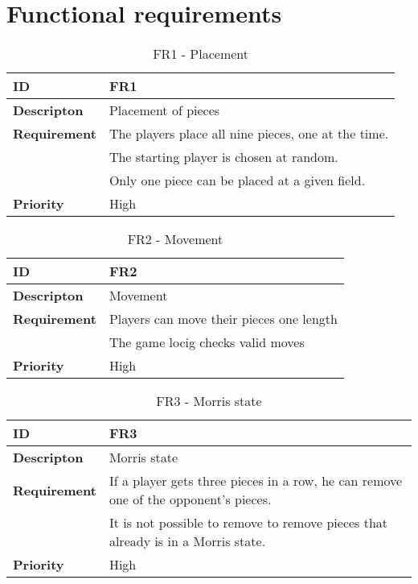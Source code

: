 \section{Functional requirements}

\begin{table}[h!]
\begin{tabular}{ | p{90pt} | p{270pt}  |}
\hline
\bf ID &  FR1  \\ \hline
\bf Descripton & Placement of pieces \\ \hline 
\bf Requirement & The players place all nine pieces, one at the time.  \\   
& The starting player is chosen at random. \\ 
& Only one piece can be placed at a given field. \\ \hline
\bf Priority & High \\ \hline

\end{tabular}
\caption{FR1 - Placement}
\end{table}

\begin{table}[h!]
\begin{tabular}{ | p{90pt} | p{270pt}  |}
\hline
\bf ID &  FR2  \\ \hline
\bf Descripton & Movement \\ \hline 
\bf Requirement & Players can move their pieces one length  \\
& The game locig checks valid moves  \\ \hline
\bf Priority & High \\ \hline

\end{tabular}
\caption{FR2 - Movement}
\end{table}

\begin{table}[h!]
\begin{tabular}{ | p{90pt} | p{270pt}  |}
\hline
\bf ID &  FR3  \\ \hline
\bf Descripton & Morris state \\ \hline 
\bf Requirement & If a player gets three pieces in a row, he can remove one of the opponent's pieces.  \\
& It is not possible to remove to remove pieces that already is in a Morris state. \\ \hline
\bf Priority & High \\ \hline

\end{tabular}
\caption{FR3 - Morris state}
\end{table}

